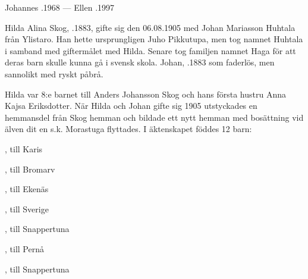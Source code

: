 Johannes .1968   ---    Ellen .1997


%
Hilda Alina Skog, .1883, gifte sig den 06.08.1905 med Johan Mariasson Huhtala från Ylistaro. Han hette ursprungligen Juho Pikkutupa, men tog namnet Huhtala i samband med giftermålet med Hilda. Senare tog familjen namnet Haga för att deras barn skulle kunna gå i svensk skola. Johan, .1883 som faderlös, men sannolikt med ryskt påbrå.

Hilda var 8:e barnet till Anders Johansson Skog och hans första hustru Anna Kajsa Eriksdotter. När Hilda och Johan gifte sig 1905 utstyckades en hemmansdel från Skog hemman och bildade ett nytt hemman med bosättning vid älven dit en s.k. Morastuga flyttades. I äktenskapet föddes 12 barn:
\begin{jhchildren}
  \item {}
  \item {}
  \item {}
  \item {}, till Karis
  \item {}
  \item {}, till Bromarv
  \item {}, till Ekenäs
  \item {}, till Sverige
  \item {}, till Snappertuna
  \item {}
  \item {}, till Pernå
  \item {}, till Snappertuna
\end{jhchildren}

